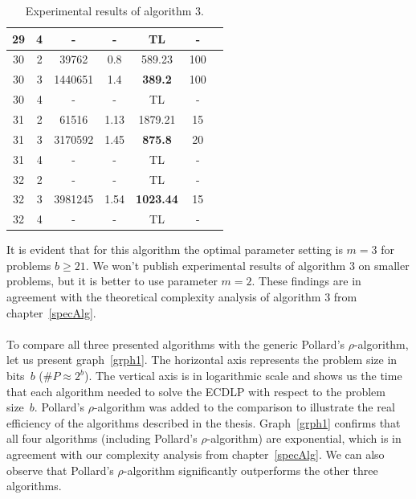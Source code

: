 \documentclass[thesis=M,english]{FITthesis}[2012/10/20]
\theoremstyle{remark}
\theoremstyle{definition}
\begin{document}
\begin{table}[H]
\begin{tabular}{ |c||c|c|c|c|c|c| }
29 & 4 & - & - & TL & - \\ \hline \hline
30 & 2 & 39762 & 0.8 & 589.23 & 100 \\ \hline 
30 & 3 & 1440651 & 1.4 & \textbf{389.2} & 100 \\ \hline 
30 & 4 & - & - & TL & - \\ \hline \hline
31 & 2 & 61516 & 1.13 & 1879.21 & 15 \\ \hline 
31 & 3 & 3170592 & 1.45 & \textbf{875.8} & 20 \\ \hline 
31 & 4 &- & - & TL & - \\ \hline \hline
32 & 2 & - & - & TL & - \\ \hline 
32 & 3 & 3981245 & 1.54 & \textbf{1023.44} & 15 \\ \hline 
32 & 4 & - & - & TL & - \\ \hline 
\end{tabular}
\caption[Experimental results of algorithm 3]{Experimental results of algorithm 3.}
\label{mcg3}
\end{table}
\noindent It is evident that for this algorithm the optimal parameter setting is $m=3$ for problems $b\geq 21$. We won't publish experimental results of algorithm 3 on smaller problems, but it is better to use parameter $m=2$. These findings are in agreement with the theoretical complexity analysis of algorithm 3 from chapter~\ref{specAlg}. 
\\ \\
\noindent To compare all three presented algorithms with the generic Pollard's $\rho$-algo\-rithm, let us present graph~\ref{grph1}. The horizontal axis represents the problem size in bits~$b$ ($\#P \approx 2^b$). The vertical axis is in logarithmic scale and shows us the time that each algorithm needed to solve the ECDLP with respect to the problem size~$b$. Pollard's $\rho$-algorithm was added to the comparison to illustrate the real efficiency of the algorithms described in the thesis. Graph~\ref{grph1} confirms that all four algorithms (including Pollard's $\rho$-algorithm) are exponential, which is in agreement with our complexity analysis from chapter~\ref{specAlg}. We can also observe that Pollard's $\rho$-algorithm significantly outperforms the other three algorithms.
\end{document}
